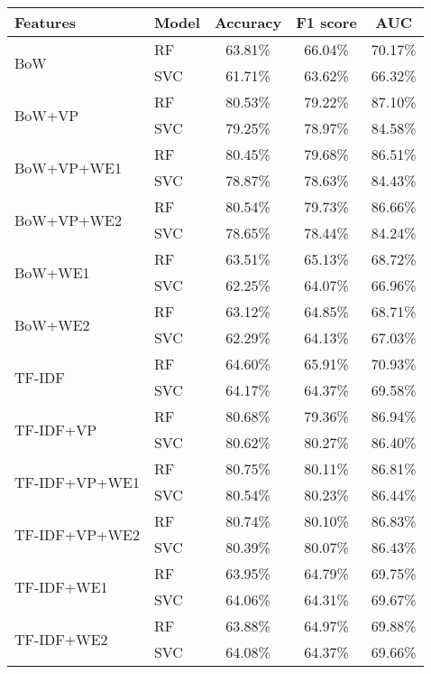 \begin{tabular}{l l c c c}
    \hline
    Features & Model & Accuracy & F1 score & AUC \\
    \hline
    \multirow[t]{2}{*}{BoW} & RF & 63.81\% & 66.04\% & 70.17\% \\
                                & SVC & 61.71\% & 63.62\% & 66.32\% \\
    \hline
    \multirow[t]{2}{*}{BoW+VP} & RF & 80.53\% & 79.22\% & 87.10\% \\
                                & SVC & 79.25\% & 78.97\% & 84.58\% \\
    \hline
    \multirow[t]{2}{*}{BoW+VP+WE1} & RF & 80.45\% & 79.68\% & 86.51\% \\
                                & SVC & 78.87\% & 78.63\% & 84.43\% \\
    \hline
    \multirow[t]{2}{*}{BoW+VP+WE2} & RF & 80.54\% & 79.73\% & 86.66\% \\
                                & SVC & 78.65\% & 78.44\% & 84.24\% \\
    \hline
    \multirow[t]{2}{*}{BoW+WE1} & RF & 63.51\% & 65.13\% & 68.72\% \\
                                & SVC & 62.25\% & 64.07\% & 66.96\% \\
    \hline
    \multirow[t]{2}{*}{BoW+WE2} & RF & 63.12\% & 64.85\% & 68.71\% \\
                                & SVC & 62.29\% & 64.13\% & 67.03\% \\
    \hline
    \multirow[t]{2}{*}{TF-IDF} & RF & 64.60\% & 65.91\% & 70.93\% \\
                                & SVC & 64.17\% & 64.37\% & 69.58\% \\
    \hline
    \multirow[t]{2}{*}{TF-IDF+VP} & RF & 80.68\% & 79.36\% & 86.94\% \\
                                & SVC & 80.62\% & 80.27\% & 86.40\% \\
    \hline
    \multirow[t]{2}{*}{TF-IDF+VP+WE1} & RF & 80.75\% & 80.11\% & 86.81\% \\
                                & SVC & 80.54\% & 80.23\% & 86.44\% \\
    \hline
    \multirow[t]{2}{*}{TF-IDF+VP+WE2} & RF & 80.74\% & 80.10\% & 86.83\% \\
                                & SVC & 80.39\% & 80.07\% & 86.43\% \\
    \hline
    \multirow[t]{2}{*}{TF-IDF+WE1} & RF & 63.95\% & 64.79\% & 69.75\% \\
                                & SVC & 64.06\% & 64.31\% & 69.67\% \\
    \hline
    \multirow[t]{2}{*}{TF-IDF+WE2} & RF & 63.88\% & 64.97\% & 69.88\% \\
                                & SVC & 64.08\% & 64.37\% & 69.66\% \\
    \hline
\end{tabular}